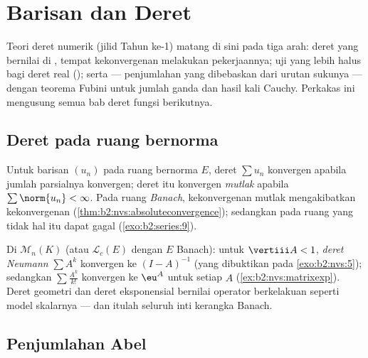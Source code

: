 \chapter{Barisan dan Deret}\label{ch:b2:series}

Teori deret numerik (jilid Tahun ke-1) matang di sini pada tiga
arah: deret yang bernilai di , tempat kekonvergenan
 melakukan pekerjaannya; uji yang lebih halus bagi deret real
(); serta \emph{} --- penjumlahan
yang dibebaskan dari urutan sukunya ---  dengan teorema Fubini
untuk jumlah ganda dan hasil kali Cauchy. Perkakas ini mengusung semua
bab deret fungsi berikutnya.

\section{Deret pada ruang bernorma}

\begin{definition}\label{def:b2:series:def}
Untuk barisan $(u_n)$ pada ruang bernorma $E$, deret $\sum u_n$
konvergen apabila jumlah parsialnya konvergen; deret itu konvergen
\emph{mutlak} apabila
$\sum \norm{u_n} < \infty$. Pada ruang \emph{Banach}, kekonvergenan
mutlak mengakibatkan kekonvergenan
(\cref{thm:b2:nvs:absoluteconvergence}); sedangkan pada ruang yang tidak
 hal itu dapat gagal (\cref{exo:b2:series:9}).
\end{definition}

\begin{example}\label{ex:b2:series:neumann}
Di $\mathcal{M}_n(K)$ (atau $\mathcal{L}_c(E)$ dengan $E$ Banach): untuk
$\vertiii A < 1$, \emph{deret Neumann} $\sum A^k$ konvergen
 ke $(I - A)^{-1}$ (yang dibuktikan pada \cref{exo:b2:nvs:5});
sedangkan $\sum \frac{A^k}{k!}$ konvergen  ke $\eu^A$ untuk setiap
$A$ (\cref{ex:b2:nvs:matrixexp}). Deret geometri dan deret
eksponensial bernilai operator berkelakuan seperti model skalarnya ---
dan itulah seluruh inti kerangka Banach.
\end{example}

\section{Penjumlahan Abel}

